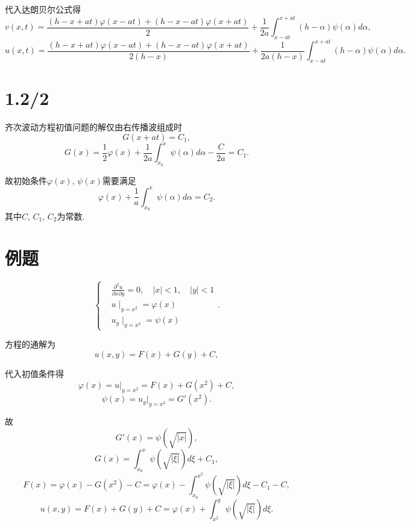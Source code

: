\documentclass[11pt,a4paper]{article}
\begin{document}
代入达朗贝尔公式得
$$v(x,t)=\frac{(h-x+at)\varphi(x-at)+(h-x-at)\varphi(x+at)}{2}+\frac{1}{2a}\int_{x-at}^{x+at}(h-\alpha)\psi(\alpha)d\alpha,$$
$$u(x,t)=\frac{(h-x+at)\varphi(x-at)+(h-x-at)\varphi(x+at)}{2(h-x)}+\frac{1}{2a(h-x)}\int_{x-at}^{x+at}(h-\alpha)\psi(\alpha)d\alpha.$$

\section{1.2/2}

齐次波动方程初值问题的解仅由右传播波组成时
$$G(x+at)=C_1,$$
$$G(x)=\frac{1}{2}\varphi(x)+\frac{1}{2a}\int_{x_0}^x\psi(\alpha)d\alpha-\frac{C}{2a}=C_1.$$

故初始条件$\varphi(x)$, $\psi(x)$需要满足
$$\varphi(x)+\frac{1}{a}\int_{x_0}^x\psi(\alpha)d\alpha=C_2.$$
其中$C$, $C_1$, $C_2$为常数.

\section*{例题}

$$\left\{\begin{aligned}
&\frac{\partial^2u}{\partial x\partial y}=0,\quad |x|<1,\quad |y|<1\\
&u\mid_{y=x^2}=\varphi(x)\\
&u_y\mid_{y=x^2}=\psi(x)
\end{aligned}\right..$$

方程的通解为
$$u(x,y)=F(x)+G(y)+C,$$

代入初值条件得
$$\varphi(x)=u|_{y=x^2}=F(x)+G(x^2)+C,$$
$$\psi(x)=u_y|_{y=x^2}=G'(x^2).$$

故
$$G'(x)=\psi(\sqrt{|x|}),$$
$$G(x)=\int_{x_0}^x\psi(\sqrt{|\xi|})d\xi+C_1,$$
$$F(x)=\varphi(x)-G(x^2)-C=\varphi(x)-\int_{x_0}^{x^2}\psi(\sqrt{|\xi|})d\xi-C_1-C,$$
$$u(x,y)=F(x)+G(y)+C=\varphi(x)+\int_{x^2}^{y}\psi(\sqrt{|\xi|})d\xi.$$
\end{document}
